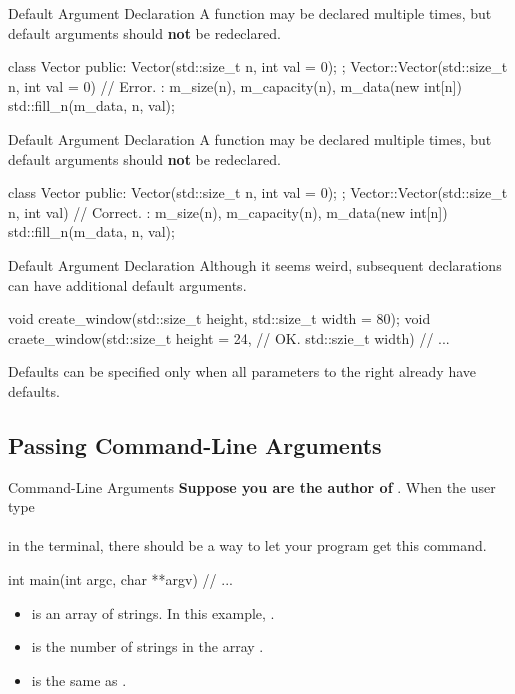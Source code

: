 \documentclass{beamer}
\begin{document}
\begin{frame}[fragile]{Default Argument Declaration}
    A function may be declared multiple times, but default arguments should \textbf{not} be redeclared.
    \begin{cpp}
class Vector {
 public:
  Vector(std::size_t n, int val = 0);
};
Vector::Vector(std::size_t n, int val = 0) // Error.
    : m_size(n), m_capacity(n), m_data(new int[n]{}) {
  std::fill_n(m_data, n, val);
}
    \end{cpp}
\end{frame}

\begin{frame}[fragile]{Default Argument Declaration}
    A function may be declared multiple times, but default arguments should \textbf{not} be redeclared. 
    \begin{cpp}
class Vector {
 public:
  Vector(std::size_t n, int val = 0);
};
Vector::Vector(std::size_t n, int val) // Correct.
    : m_size(n), m_capacity(n), m_data(new int[n]{}) {
  std::fill_n(m_data, n, val);
}
    \end{cpp}
\end{frame}

\begin{frame}[fragile]{Default Argument Declaration}
    Although it seems weird, subsequent declarations can have additional default arguments.
    \begin{cpp}
void create_window(std::size_t height,
                   std::size_t width = 80);
void craete_window(std::size_t height = 24, // OK.
                   std::szie_t width) {
  // ...
}
    \end{cpp}
    Defaults can be specified only when all parameters to the right already have defaults.
\end{frame}

\subsection{Passing Command-Line Arguments}

\begin{frame}[fragile]{Command-Line Arguments}
    \textbf{Suppose you are the author of }. When the user type\\
    \\
    in the terminal, there should be a way to let your program get this command.
    \pause
    \begin{cpp}
int main(int argc, char **argv) {
  // ...
}
    \end{cpp}
    \begin{itemize}
        \item {} is an array of strings. In this example, .
        \item {} is the number of strings in the array .
        \item {} is the same as .
    \end{itemize}
\end{frame}
\end{document}
